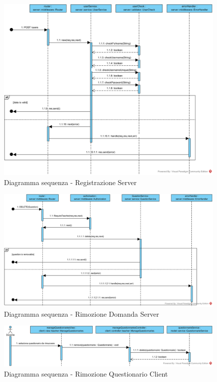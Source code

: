 \documentclass[12pt,a4paper]{article}
\begin{document}
\begin{center}
	\begin{figure}[H]
		\centering \includegraphics[max width=\myheight, angle=90 ]{../img/diagrammiSequenza/registrazioneServer.png}
		\caption{Diagramma sequenza - Registrazione Server}
	\end{figure}
\end{center}


\begin{center}
	\begin{figure}[H]
		\centering \includegraphics[max width=\myheight, angle=90 ]{../img/diagrammiSequenza/rimozioneDomandaServer.png}
		\caption{Diagramma sequenza - Rimozione Domanda Server}
	\end{figure}
\end{center}


\begin{center}
	\begin{figure}[H]
		\centering \includegraphics[max width=\myheight, angle=90 ]{../img/diagrammiSequenza/rimozioneQuestionarioClient.png}
		\caption{Diagramma sequenza - Rimozione Questionario Client}
	\end{figure}
\end{center}
\end{document}
